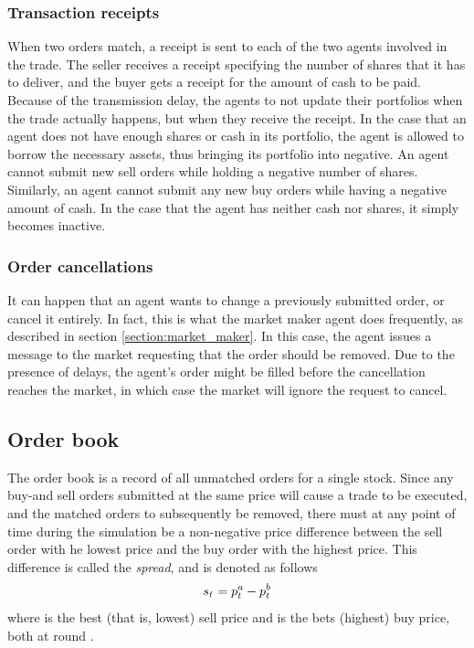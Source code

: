 \subsubsection{Transaction receipts}
When two orders match, a receipt is sent to each of the two agents involved in the trade. The seller receives a receipt specifying the number of shares that it has to deliver, and the buyer gets a receipt for the amount of cash to be paid. Because of the transmission delay, the agents to not update their portfolios when the trade actually happens, but when they receive the receipt. In the case that an agent does not have enough shares or cash in its portfolio, the agent is allowed to borrow the necessary assets, thus bringing its portfolio into negative. An agent cannot submit new sell orders while holding a negative number of shares. Similarly, an agent cannot submit any new buy orders while having a negative amount of cash. In the case that the agent has neither cash nor shares, it simply becomes inactive.

\subsubsection{Order cancellations}
It can happen that an agent wants to change a previously submitted order, or cancel it entirely. In fact, this is what the market maker agent does frequently, as described in section \ref{section:market_maker}. In this case, the agent issues a message to the market requesting that the order should be removed. Due to the presence of delays, the agent's order might be filled before the cancellation reaches the market, in which case the market will ignore the request to cancel.

\subsection{Order book}
The order book is a record of all unmatched orders for a single stock. Since any buy-and sell orders submitted at the same price will cause a trade to be executed, and the matched orders to subsequently be removed, there must at any point of time during the simulation be a non-negative price difference between the sell order with he lowest price and the buy order with the highest price. This difference is called the \textit{spread}, and is denoted as follows
\begin{equation}\label{equation:spread_definition}
s_{t_{} } = p^a_{t_{} } - p^b_{t_{} }
\end{equation}
where  is the best (that is, lowest) sell price and  is the bets (highest) buy price, both at round . 


